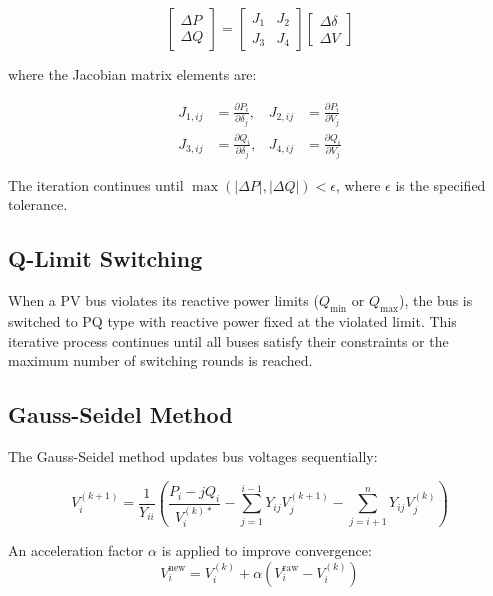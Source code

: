 \documentclass[12pt,a4paper]{article}
\begin{document}
\begin{equation}
\begin{bmatrix} \Delta P \\ \Delta Q \end{bmatrix} = 
\begin{bmatrix} J_1 & J_2 \\ J_3 & J_4 \end{bmatrix}
\begin{bmatrix} \Delta \delta \\ \Delta V \end{bmatrix}
\end{equation}

where the Jacobian matrix elements are:

\begin{align}
J_{1,ij} &= \frac{\partial P_i}{\partial \delta_j}, & J_{2,ij} &= \frac{\partial P_i}{\partial V_j} \\
J_{3,ij} &= \frac{\partial Q_i}{\partial \delta_j}, & J_{4,ij} &= \frac{\partial Q_i}{\partial V_j}
\end{align}

The iteration continues until $\max(|\Delta P|, |\Delta Q|) < \epsilon$, where $\epsilon$ is the specified tolerance.

\subsection{Q-Limit Switching}

When a PV bus violates its reactive power limits ($Q_{\min}$ or $Q_{\max}$), the bus is switched to PQ type with reactive power fixed at the violated limit. This iterative process continues until all buses satisfy their constraints or the maximum number of switching rounds is reached.

\subsection{Gauss-Seidel Method}

The Gauss-Seidel method updates bus voltages sequentially:

\begin{equation}
V_i^{(k+1)} = \frac{1}{Y_{ii}} \left( \frac{P_i - jQ_i}{V_i^{(k)*}} - \sum_{j=1}^{i-1} Y_{ij} V_j^{(k+1)} - \sum_{j=i+1}^{n} Y_{ij} V_j^{(k)} \right)
\end{equation}

An acceleration factor $\alpha$ is applied to improve convergence:
\begin{equation}
V_i^{\text{new}} = V_i^{(k)} + \alpha \left( V_i^{\text{raw}} - V_i^{(k)} \right)
\end{equation}
\end{document}
